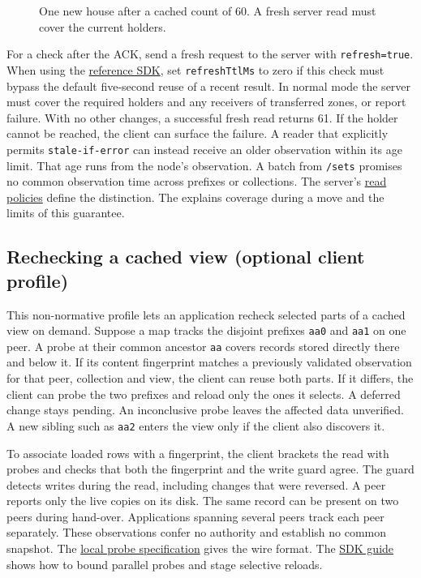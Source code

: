 \documentclass[11pt]{article}
\begin{document}
\begin{figure}[H]
    \centering
    \caption{One new house after a cached count of 60. A fresh server read must cover the current holders.}
\end{figure}
For a check after the ACK, send a fresh request to the server with \texttt{refresh=true}. When using the \href{https://github.com/indexus/sdk/blob/83f2db1ad52ac695ab01cb2ca188f23300271bd7/src/network/index.js#L107-L114}{reference SDK}, set \texttt{refreshTtlMs} to zero if this check must bypass the default five-second reuse of a recent result. In normal mode the server must cover the required holders and any receivers of transferred zones, or report failure. With no other changes, a successful fresh read returns 61. If the holder cannot be reached, the client can surface the failure. A reader that explicitly permits \texttt{stale-if-error} can instead receive an older observation within its age limit. That age runs from the node's observation. A batch from \texttt{/sets} promises no common observation time across prefixes or collections. The server's \href{https://github.com/indexus/core/blob/5188b61/docs/protocol/read-modes.md}{read policies} define the distinction. The  explains coverage during a move and the limits of this guarantee.

\subsection{Rechecking a cached view (optional client profile)}\hypertarget{ix:local-refresh}{}
This non-normative profile lets an application recheck selected parts of a cached view on demand. Suppose a map tracks the disjoint prefixes \texttt{aa0} and \texttt{aa1} on one peer. A probe at their common ancestor \texttt{aa} covers records stored directly there and below it. If its content fingerprint matches a previously validated observation for that peer, collection and view, the client can reuse both parts. If it differs, the client can probe the two prefixes and reload only the ones it selects. A deferred change stays pending. An inconclusive probe leaves the affected data unverified. A new sibling such as \texttt{aa2} enters the view only if the client also discovers it.

To associate loaded rows with a fingerprint, the client brackets the read with probes and checks that both the fingerprint and the write guard agree. The guard detects writes during the read, including changes that were reversed. A peer reports only the live copies on its disk. The same record can be present on two peers during hand-over. Applications spanning several peers track each peer separately. These observations confer no authority and establish no common snapshot. The \href{https://github.com/indexus/core/blob/991de04ada736688dfafde4c933871564acf836c/docs/protocol/subtree-fingerprint.md}{local probe specification} gives the wire format. The \href{https://github.com/indexus/sdk/blob/a79901ce72a35130441d4dfb56963e51ce8a3284/docs/observed-cut-refresh.md}{SDK guide} shows how to bound parallel probes and stage selective reloads.
\end{document}
